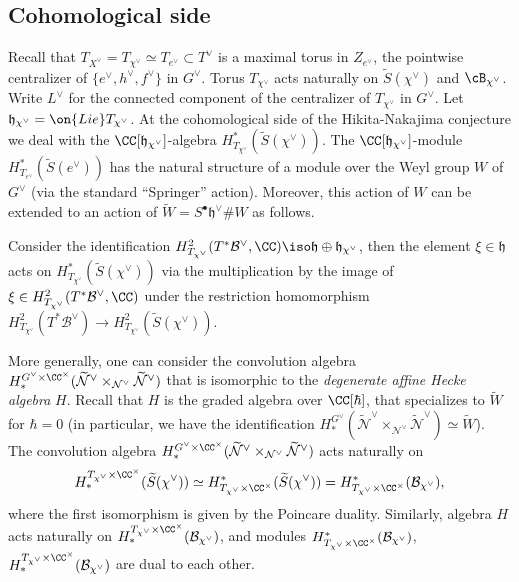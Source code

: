 \documentclass[12pt]{amsart}
\begin{document}
\subsection{Cohomological side}
Recall that  $T_{X^\vee}=T_{\chi^\vee}\simeq T_{e^\vee} \subset T^\vee$ is a maximal torus in $Z_{e^\vee}$, the pointwise centralizer of $\{e^\vee, h^\vee, f^{\vee}\}$ in $G^\vee$. Torus $T_{\chi^\vee}$ acts naturally on $\widetilde{S}(\chi^\vee)$ and $\cB_{\chi^\vee}$. Write $L^\vee$ for the connected component of the centralizer of $T_{\chi^\vee}$ in $G^\vee$. Let $\mathfrak{h}_{\chi^\vee}=\on{Lie}T_{\chi^\vee}$. At the cohomological side of the Hikita-Nakajima conjecture we deal with the $\CC[\mathfrak{h}_{\chi^\vee}]$-algebra $H^*_{T_{\chi^\vee}}(\widetilde{S}(\chi^\vee))$. The $\CC[\mathfrak{h}_{\chi^\vee}]$-module $H^*_{T_{e^\vee}}(\widetilde{S}(e^\vee))$ has the natural structure of a module over the Weyl group $W$ of $G^\vee$ (via the standard ``Springer'' action). Moreover, this action of $W$ can be extended to an action of $\widetilde{W}= S^\bullet\mathfrak{h}^{\vee} \# W$ as follows.

Consider the identification $H^2_{T_{\chi^\vee}}(T^*\mathcal{B}^\vee,\CC) \iso \mathfrak{h} \oplus \mathfrak{h}_{\chi^\vee}$, then the element $\xi \in \mathfrak{h}$ acts on $H^*_{T_{\chi^\vee}}(\widetilde{S}(\chi^\vee))$ via the multiplication by the image of $\xi \in H^2_{T_{\chi^\vee}}(T^*\mathcal{B}^\vee,\CC)$ under the restriction homomorphism $H^2_{T_{\chi^\vee}}(T^*\mathcal{B}^\vee) \rightarrow H^2_{T_{\chi^\vee}}(\widetilde{S}(\chi^\vee))$. 



\begin{rmk}
More generally, one can consider the convolution algebra $H^{G^\vee \times \CC^\times}_{*}(\widetilde{\mathcal{N}}^\vee \times_{\mathcal{N}^\vee} \widetilde{\mathcal{N}}^\vee)$ that is isomorphic to the {\emph{degenerate affine Hecke algebra}} $H$. Recall that $H$ is the graded algebra over $\CC[\hbar]$, that specializes  to $\widetilde{W}$ for $\hbar=0$ (in particular, we have the identification $H^{G^\vee}_{*}(\widetilde{\mathcal{N}}^\vee \times_{\mathcal{N}^\vee} \widetilde{\mathcal{N}}^\vee) \simeq \widetilde{W}$). The convolution algebra  $H^{G^\vee \times \CC^\times}_{*}(\widetilde{\mathcal{N}}^\vee \times_{\mathcal{N}^\vee} \widetilde{\mathcal{N}}^\vee)$ acts naturally on 
\begin{equation*}
H_*^{T_{\chi^\vee} \times \CC^\times}(\widetilde{S}(\chi^\vee)) \simeq H^*_{T_{\chi^\vee}\times \CC^\times}(\widetilde{S}(\chi^\vee))=H^*_{T_{\chi^\vee}\times \CC^\times}(\mathcal{B}_{\chi^\vee}),
\end{equation*} 
where the first isomorphism is given by the Poincare duality.%
Similarly, algebra $H$ acts naturally on $H_*^{T_{\chi^\vee} \times \CC^\times}(\mathcal{B}_{\chi^\vee})$, and modules $H^*_{T_{\chi^\vee}\times \CC^\times}(\mathcal{B}_{\chi^\vee})$, $H_*^{T_{\chi^\vee} \times \CC^\times}(\mathcal{B}_{\chi^\vee})$ are dual to each other.
\end{rmk}
\end{document}
